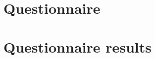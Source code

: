 \begin{appendices}
\makeatletter
\renewcommand{\thesection}{\@arabic\c@section}  %
\makeatother

\section{Questionnaire}



\section{Questionnaire results}

\end{appendices}

